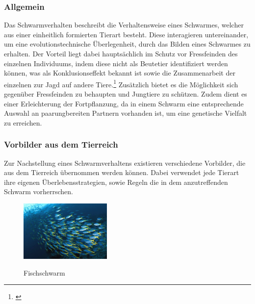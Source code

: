 \subsubsection{Allgemein}

Das Schwarmverhalten beschreibt die Verhaltensweise eines Schwarmes, welcher aus einer einheitlich formierten Tierart besteht.  Diese interagieren untereinander, um eine evolutionstechnische Überlegenheit, durch das Bilden eines Schwarmes zu erhalten. Der Vorteil liegt dabei hauptsächlich im Schutz vor Fressfeinden des einzelnen Individuums, indem diese nicht als Beutetier identifiziert werden können, was als Konklusionseffekt bekannt ist sowie die Zusammenarbeit der einzelnen zur Jagd auf andere Tiere.\footnote{\citep[vgl.][Schwarmverhalten]{Spektrum.SchwarmverhaltenKompaktlexikon}\label{note46}} Zusätzlich bietet es die Möglichkeit sich gegenüber Fressfeinden zu behaupten und Jungtiere zu schützen. Zudem dient es einer Erleichterung der Fortpflanzung, da in einem Schwarm eine entsprechende Auswahl an paarungbereiten Partnern vorhanden ist, um eine genetische Vielfalt zu erreichen.

\subsubsection{Vorbilder aus dem Tierreich}

Zur Nachstellung eines Schwarmverhaltens existieren verschiedene Vorbilder, die aus dem Tierreich übernommen werden können. Dabei verwendet jede Tierart ihre eigenen Überlebensstrategien, sowie Regeln die in dem anzutreffenden Schwarm vorherrschen.
\begin{figure}
	\begin{center}
		\includegraphics[width=0.4\textwidth]{images/technische_grundlagen/fischschwarm.jpg}
	\end{center}
	\caption{Fischschwarm}
	\cite{Prezi.Gefahrdungder}
	\label{fig:fischschwarm}
\end{figure}

\noindent
